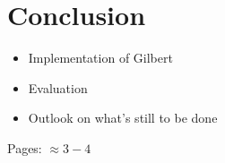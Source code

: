 \chapter{Conclusion}
\label{cha:conclusion}

\begin{itemize}
	\item Implementation of Gilbert
	\item Evaluation
	\item Outlook on what's still to be done
\end{itemize}

Pages: $\approx 3-4$